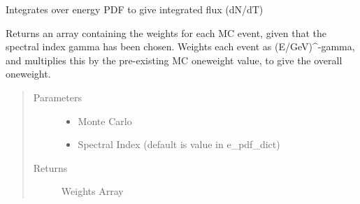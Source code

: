 \documentclass[letterpaper,10pt,english]{sphinxmanual}
\begin{document}
\begin{fulllineitems}
\begin{fulllineitems}
\end{fulllineitems}


\begin{fulllineitems}
Integrates over energy PDF to give integrated flux (dN/dT)

\end{fulllineitems}


\begin{fulllineitems}
\end{fulllineitems}


\begin{fulllineitems}
\end{fulllineitems}


\begin{fulllineitems}
Returns an array containing the weights for each MC event,
given that the spectral index gamma has been chosen. Weights each
event as (E/GeV)\textasciicircum{}-gamma, and multiplies this by the pre-existing MC
oneweight value, to give the overall oneweight.
\begin{quote}\begin{description}
\item[{Parameters}] \leavevmode\begin{itemize}
\item {} 
 \textendash{} Monte Carlo

\item {} 
 \textendash{} Spectral Index (default is value in e\_pdf\_dict)

\end{itemize}

\item[{Returns}] \leavevmode
Weights Array

\end{description}\end{quote}

\end{fulllineitems}


\end{fulllineitems}
\end{document}
